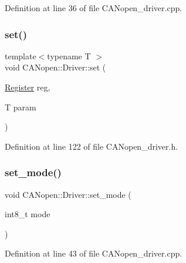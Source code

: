 Definition at line 36 of file C\+A\+Nopen\+\_\+driver.\+cpp.

\mbox{\label{class_c_a_nopen_1_1_driver_a66b64a600d9a0cdada81071b8cb412c8}} 
\subsubsection{\texorpdfstring{set()}{set()}}
{\footnotesize\ttfamily template$<$typename T $>$ \\
void C\+A\+Nopen\+::\+Driver\+::set (\begin{DoxyParamCaption}\item[{\hyperlink{class_c_a_nopen_1_1_driver_a9504ce08c5bec248880fe4e6803565f7}{Register}}]{reg,  }\item[{T}]{param }\end{DoxyParamCaption})\hspace{0.3cm}{\ttfamily [inline]}}



Definition at line 122 of file C\+A\+Nopen\+\_\+driver.\+h.

\mbox{\label{class_c_a_nopen_1_1_driver_a35e035da9a3f9d6771f3e8b54ac80e73}} 
\subsubsection{\texorpdfstring{set\+\_\+mode()}{set\_mode()}}
{\footnotesize\ttfamily void C\+A\+Nopen\+::\+Driver\+::set\+\_\+mode (\begin{DoxyParamCaption}\item[{int8\+\_\+t}]{mode }\end{DoxyParamCaption})}



Definition at line 43 of file C\+A\+Nopen\+\_\+driver.\+cpp.

\mbox{\label{class_c_a_nopen_1_1_driver_af549ce9c0b8c8125f8ddf26fab6810cf}} 
